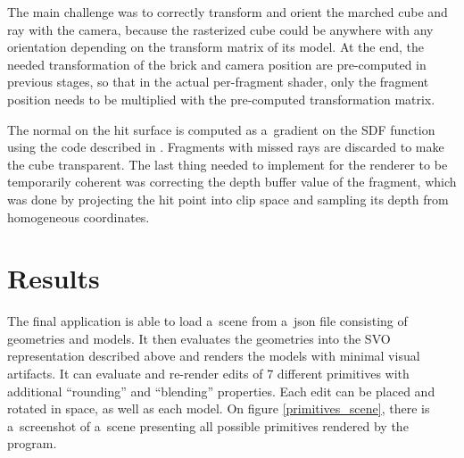 \documentclass[11pt, a4paper]{article}
\renewcommand{\uv}[1]{``#1''}
\begin{document}
The main challenge was to correctly transform and orient the marched cube and ray with the camera, because the rasterized cube could be anywhere with any orientation depending on the transform matrix of its model.
At the end, the needed transformation of the brick and camera position are pre-computed in previous stages, so that in the actual per-fragment shader, only the fragment position needs to be multiplied with the pre-computed transformation matrix.

The normal on the hit surface is computed as a~gradient on the SDF function using the code described in \cite{Quilez_normals}.
Fragments with missed rays are discarded to make the cube transparent.
The last thing needed to implement for the renderer to be temporarily coherent was correcting the depth buffer value of the fragment, which was done by projecting the hit point into clip space and sampling its depth from homogeneous coordinates.


\section{Results}

The final application is able to load a~scene from a~json file consisting of geometries and models. It then evaluates the geometries into the SVO representation described above and renders the models with minimal visual artifacts. It can evaluate and re-render edits of 7 different primitives with additional \uv{rounding} and \uv{blending} properties. Each edit can be placed and rotated in space, as well as each model. On figure \ref{primitives_scene}, there is a~screenshot of a~scene presenting all possible primitives rendered by the program.
\end{document}
